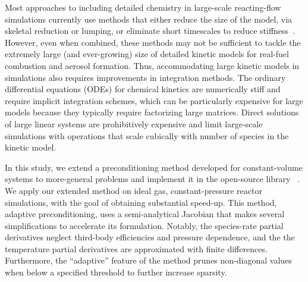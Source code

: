 \documentclass[preprint, 12pt]{elsarticle}
\begin{document}
Most approaches to including detailed chemistry in large-scale reacting-flow simulations currently use methods that either reduce the size of the model, via skeletal reduction or lumping, or eliminate short timescales to reduce stiffness~\cite{Lu2009, Pepiot2019}.
However, even when combined, these methods may not be sufficient to tackle the extremely large (and ever-growing) size of detailed kinetic models for real-fuel combustion and aerosol formation.
Thus, accommodating large kinetic models in simulations also requires improvements in integration methods.
The ordinary differential equations (ODEs) for chemical kinetics are numerically stiff and require implicit integration schemes, which can be particularly expensive for large models because they typically require factorizing large matrices.
Direct solutions of large linear systems are prohibitively expensive and limit large-scale simulations with operations that scale cubically with number of species in the kinetic model.

In this study, we extend a preconditioning method developed for constant-volume systems \cite{mcnenly_faster_2015} to more-general problems and implement it in the open-source library \cantera{}~\cite{cantera}.
We apply our extended method on ideal gas, constant-pressure reactor simulations, with the goal of obtaining substantial speed-up.
This method, adaptive preconditioning, uses a semi-analytical Jacobian that makes several simplifications to accelerate its formulation.
Notably, the species-rate partial derivatives neglect third-body efficiencies and pressure dependence, and the
the temperature partial derivatives are approximated with finite differences.
Furthermore, the ``adaptive'' feature of the method prunes non-diagonal values when below a specified threshold to further increase sparsity.
\end{document}
